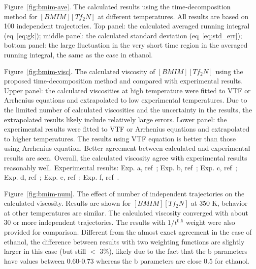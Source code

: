 \documentclass[12pt]{article}
\begin{document}
Figure~\ref{fig:bmim-ave}.
The calculated results using the time-decomposition method for $[BMIM][Tf_2N]$ at different temperatures.
All results are based on 100 independent trajectories.
Top panel: the calculated averaged running integral (eq~\ref{eq:gk});
middle panel: the calculated standard deviation (eq~\ref{eq:std_err});
bottom panel: the large fluctuation in the very short time region in the averaged running integral,
the same as the case in ethanol.

Figure~\ref{fig:bmim-visc}.
The calculated viscosity of $[BMIM][Tf_2N]$ using the proposed time-decomposition method
and compared with experimental results.
Upper panel: the calculated viscosities at high temperature were fitted to VTF or Arrhenius equations
and extrapolated to low experimental temperatures.
Due to the limited number of calculated viscosities and the uncertainty in the results,
the extrapolated results likely include relatively large errors.
Lower panel: the experimental results were fitted to VTF or Arrhenius equations
and extrapolated to higher temperatures.
The results using VTF equation is better than those using Arrhenius equation.
Better agreement between calculated and experimental results are seen.
Overall, the calculated viscosity agree with experimental results reasonably well.
Experimental results: 
Exp. a, ref~\cite{Gadzuric.JCED.57.1072.2012};
Exp. b, ref~\cite{Katsuta.JCED.55.1588.2010};
Exp. c, ref~\cite{Watanabe.JPCB.110.19593.2006};
Exp. d, ref~\cite{Majer.GC.8.172.2006};
Exp. e, ref~\cite{Watanabe.JPCB.109.6103.2005};
Exp. f, ref~\cite{VanderNoot.JEC.568.167.2004}.

Figure~\ref{fig:bmim-num}.
The effect of number of independent trajectories on the calculated viscosity.
Results are shown for $[BMIM][Tf_2N]$ at 350 K, behavior at other temperatures are similar.
The calculated viscosity converged with about 30 or more independent trajectories.
The results with $1/t^{0.5}$ weight were also provided for comparison.
Different from the almost exact agreement in the case of ethanol,
the difference between results with two weighting functions are slightly larger in this case
(but still $<$ 3\%),
likely due to the fact that the b parameters have values between 0.60-0.73
whereas the b parameters are close 0.5 for ethanol.




\newpage
\clearpage
\begin{figure}
\begin{center}
\caption{}
\label{fig:visc-longtraj}
\end{center}
\end{figure}
\end{document}

